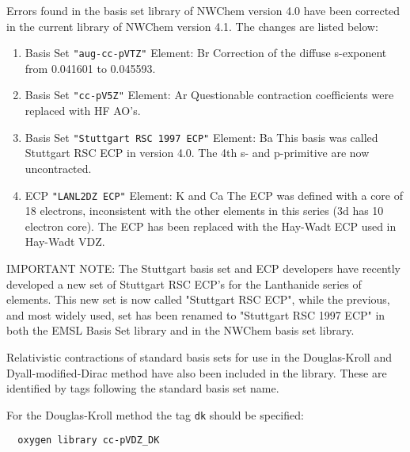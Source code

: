 Errors found in the basis set library of NWChem version 4.0 have been corrected in 
the current library of NWChem version 4.1. The changes are listed below:

\begin{enumerate}

\item Basis Set \verb#"aug-cc-pVTZ"# \newline 
 Element: Br \newline
 Correction of the diffuse s-exponent from 0.041601 to 0.045593.

\item Basis Set \verb#"cc-pV5Z"# \newline 
 Element: Ar \newline
 Questionable contraction coefficients were replaced with HF AO's.

\item Basis Set \verb#"Stuttgart RSC 1997 ECP"# \newline 
 Element: Ba \newline
 This basis was called Stuttgart RSC ECP in version 4.0.
 The 4th s- and p-primitive are now uncontracted.

\item ECP \verb#"LANL2DZ ECP"# \newline 
 Element: K and Ca \newline
 The ECP was defined with a core of 18 electrons, inconsistent with the other
 elements in this series (3d has 10 electron core). The ECP has been replaced 
 with the Hay-Wadt ECP used in Hay-Wadt VDZ.

\end{enumerate}

IMPORTANT NOTE:
The Stuttgart basis set and ECP developers have recently developed a new set of 
Stuttgart RSC ECP's for the Lanthanide series of elements. This new set is 
now called "Stuttgart RSC ECP", while the previous, and most widely used, 
set has been renamed to "Stuttgart RSC 1997 ECP" in both the EMSL Basis Set 
library and in the NWChem basis set library. 

Relativistic contractions of standard basis sets for use in the Douglas-Kroll 
and Dyall-modified-Dirac method have also been included in the library. These
are identified by tags following the standard basis set name.  \newline

For the Douglas-Kroll method the tag \verb+dk+ should be specified: 

\begin{verbatim}
  oxygen library cc-pVDZ_DK
\end{verbatim}

